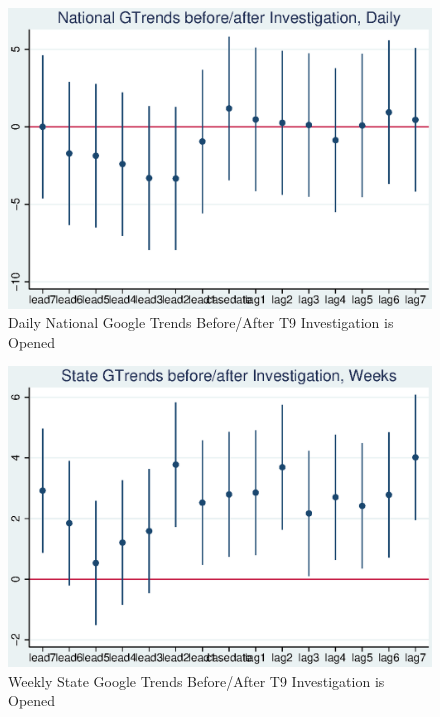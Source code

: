 \documentclass[AER]{AEA}
\begin{document}
\begin{figure}
\includegraphics[]{figures/national_trend_cases.eps}

\caption{Daily National Google Trends Before/After T9 Investigation is Opened}
\end{figure}

\begin{figure}
\includegraphics[]{figures/state_trend_cases.eps}

\caption{Weekly State Google Trends Before/After T9 Investigation is Opened}

\end{figure}
\end{document}
